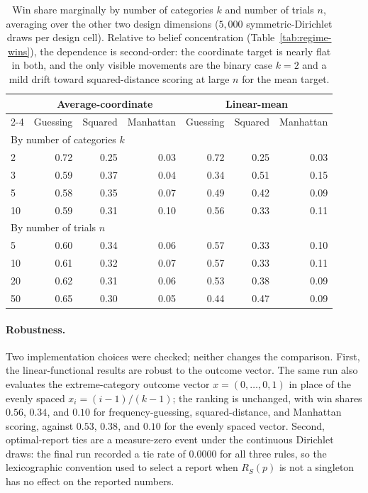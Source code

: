 \begin{table}[h]
\centering
\small
\begin{tabular}{lrrrrrr}
\hline
& \multicolumn{3}{c}{Average-coordinate} & \multicolumn{3}{c}{Linear-mean}\\
\cline{2-4}\cline{5-7}
& Guessing & Squared & Manhattan & Guessing & Squared & Manhattan\\
\hline
\multicolumn{7}{l}{By number of categories \(k\)}\\
2  & 0.72 & 0.25 & 0.03 & 0.72 & 0.25 & 0.03\\
3  & 0.59 & 0.37 & 0.04 & 0.34 & 0.51 & 0.15\\
5  & 0.58 & 0.35 & 0.07 & 0.49 & 0.42 & 0.09\\
10 & 0.59 & 0.31 & 0.10 & 0.56 & 0.33 & 0.11\\
\hline
\multicolumn{7}{l}{By number of trials \(n\)}\\
5  & 0.60 & 0.34 & 0.06 & 0.57 & 0.33 & 0.10\\
10 & 0.61 & 0.32 & 0.07 & 0.57 & 0.33 & 0.11\\
20 & 0.62 & 0.31 & 0.06 & 0.53 & 0.38 & 0.09\\
50 & 0.65 & 0.30 & 0.05 & 0.44 & 0.47 & 0.09\\
\hline
\end{tabular}
\caption{Win share marginally by number of categories \(k\) and number of trials \(n\), averaging over the other two design dimensions (\(5{,}000\) symmetric-Dirichlet draws per design cell). Relative to belief concentration (Table~\ref{tab:regime-wins}), the dependence is second-order: the coordinate target is nearly flat in both, and the only visible movements are the binary case \(k=2\) and a mild drift toward squared-distance scoring at large \(n\) for the mean target.}
\label{tab:design-nk}
\end{table}

\paragraph{Robustness.}
Two implementation choices were checked; neither changes the comparison.
First, the linear-functional results are robust to the outcome vector.
The same run also evaluates the extreme-category outcome vector \(x=(0,\ldots,0,1)\) in place of the evenly spaced \(x_i=(i-1)/(k-1)\); the ranking is unchanged, with win shares \(0.56\), \(0.34\), and \(0.10\) for frequency-guessing, squared-distance, and Manhattan scoring, against \(0.53\), \(0.38\), and \(0.10\) for the evenly spaced vector.
Second, optimal-report ties are a measure-zero event under the continuous Dirichlet draws: the final run recorded a tie rate of \(0.0000\) for all three rules, so the lexicographic convention used to select a report when \(R_S(p)\) is not a singleton has no effect on the reported numbers.

